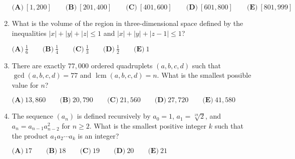 \documentclass{article}
\begin{document}
\begin{enumerate}[label=\arabic*., itemsep=0.5em]
$\textbf{(A)}\ [1,200]\qquad\textbf{(B)}\ [201,400]\qquad\textbf{(C)}\ [401,600]\qquad\textbf{(D)}\ [601,800]\qquad\textbf{(E)}\ [801,999]$\par \vspace{0.5em}\item What is the volume of the region in three-dimensional space defined by the inequalities $|x|+|y|+|z|\le1$ and $|x|+|y|+|z-1|\le1$?

$\textbf{(A)}\ \frac{1}{6}\qquad\textbf{(B)}\ \frac{1}{4}\qquad\textbf{(C)}\ \frac{1}{3}\qquad\textbf{(D)}\ \frac{1}{2}\qquad\textbf{(E)}\ 1$\par \vspace{0.5em}\item There are exactly $77,000$ ordered quadruplets $(a, b, c, d)$ such that $\gcd(a, b, c, d) = 77$ and $\operatorname{lcm}(a, b, c, d) = n$. What is the smallest possible value for $n$?

$\textbf{(A)}\ 13,860\qquad\textbf{(B)}\ 20,790\qquad\textbf{(C)}\ 21,560 \qquad\textbf{(D)}\ 27,720 \qquad\textbf{(E)}\ 41,580$\par \vspace{0.5em}\item The sequence $(a_n)$ is defined recursively by $a_0=1$, $a_1=\sqrt[19]{2}$, and $a_n=a_{n-1}a_{n-2}^2$ for $n\geq 2$. What is the smallest positive integer $k$ such that the product $a_1a_2\cdots a_k$ is an integer?

$\textbf{(A)}\ 17\qquad\textbf{(B)}\ 18\qquad\textbf{(C)}\ 19\qquad\textbf{(D)}\ 20\qquad\textbf{(E)}\ 21$\par \vspace{0.5em}\end{enumerate}
\end{document}
